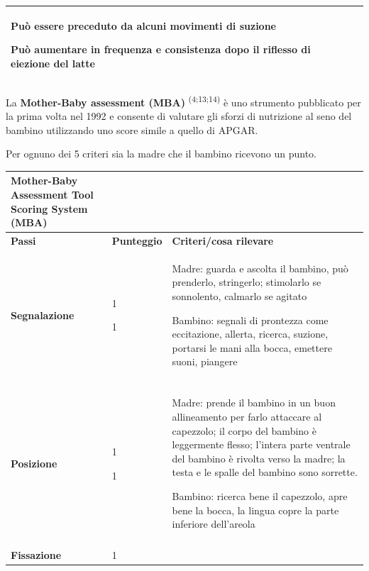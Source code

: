 \documentclass[]{article}
\begin{document}
\begin{longtable}[]{@{}ll@{}}
\begin{minipage}[t]{0.47\columnwidth}
Può essere preceduto da alcuni movimenti di suzione

Può aumentare in frequenza e consistenza dopo il riflesso di eiezione
del latte\strut
\end{minipage}\tabularnewline
\bottomrule
\end{longtable}

La \textbf{Mother-Baby assessment (MBA)} \textsuperscript{(4;13;14)} è
uno strumento pubblicato per la prima volta nel 1992 e consente di
valutare gli sforzi di nutrizione al seno del bambino utilizzando uno
score simile a quello di APGAR.

Per ognuno dei 5 criteri sia la madre che il bambino ricevono un punto.

\begin{longtable}[]{@{}lll@{}}
\toprule
\textbf{Mother-Baby Assessment Tool Scoring System (MBA)} &
&\tabularnewline
\midrule
\endhead
\textbf{Passi} & \textbf{Punteggio} & \textbf{Criteri/cosa
rilevare}\tabularnewline
\begin{minipage}[t]{0.30\columnwidth}\raggedright
\textbf{Segnalazione}\strut
\end{minipage} & \begin{minipage}[t]{0.30\columnwidth}\raggedright
1

1\strut
\end{minipage} & \begin{minipage}[t]{0.30\columnwidth}\raggedright
Madre: guarda e ascolta il bambino, può prenderlo, stringerlo;
stimolarlo se sonnolento, calmarlo se agitato

Bambino: segnali di prontezza come eccitazione, allerta, ricerca,
suzione, portarsi le mani alla bocca, emettere suoni, piangere\strut
\end{minipage}\tabularnewline
& &\tabularnewline
\begin{minipage}[t]{0.30\columnwidth}\raggedright
\textbf{Posizione}\strut
\end{minipage} & \begin{minipage}[t]{0.30\columnwidth}\raggedright
1

1\strut
\end{minipage} & \begin{minipage}[t]{0.30\columnwidth}\raggedright
Madre: prende il bambino in un buon allineamento per farlo attaccare al
capezzolo; il corpo del bambino è leggermente flesso; l'intera parte
ventrale del bambino è rivolta verso la madre; la testa e le spalle del
bambino sono sorrette.

Bambino: ricerca bene il capezzolo, apre bene la bocca, la lingua copre
la parte inferiore dell'areola\strut
\end{minipage}\tabularnewline
& &\tabularnewline
\begin{minipage}[t]{0.30\columnwidth}\raggedright
\textbf{Fissazione}\strut
\end{minipage} & \begin{minipage}[t]{0.30\columnwidth}\raggedright
1


\end{minipage}
\end{longtable}
\end{document}
